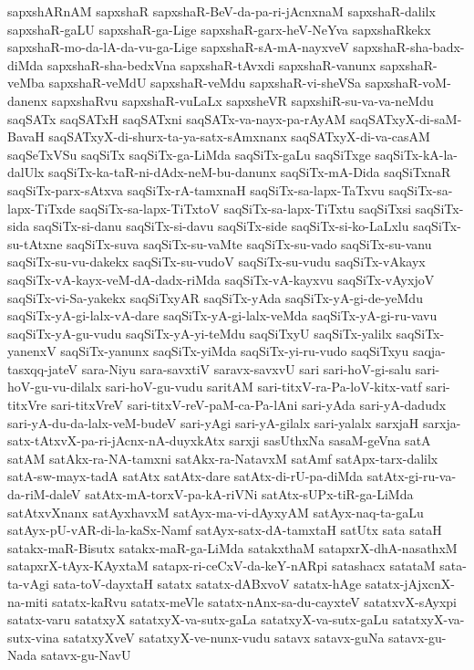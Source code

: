 {sapxshARnAM
sapxshaR
sapxshaR-BeV-da-pa-ri-jAcnxnaM
sapxshaR-dalilx
sapxshaR-gaLU
sapxshaR-ga-Lige
sapxshaR-garx-heV-NeYva
sapxshaRkekx
sapxshaR-mo-da-lA-da-vu-ga-Lige
sapxshaR-sA-mA-nayxveV
sapxshaR-sha-badx-diMda
sapxshaR-sha-bedxVna
sapxshaR-tAvxdi
sapxshaR-vanunx
sapxshaR-veMba
sapxshaR-veMdU
sapxshaR-veMdu
sapxshaR-vi-sheVSa
sapxshaR-voM-danenx
sapxshaRvu
sapxshaR-vuLaLx
sapxsheVR
sapxshiR-su-va-va-neMdu
saqSATx
saqSATxH
saqSATxni
saqSATx-va-nayx-pa-rAyAM
saqSATxyX-di-saM-BavaH
saqSATxyX-di-shurx-ta-ya-satx-sAmxnanx
saqSATxyX-di-va-casAM
saqSeTxVSu
saqSiTx
saqSiTx-ga-LiMda
saqSiTx-gaLu
saqSiTxge
saqSiTx-kA-la-dalUlx
saqSiTx-ka-taR-ni-dAdx-neM-bu-danunx
saqSiTx-mA-Dida
saqSiTxnaR
saqSiTx-parx-sAtxva
saqSiTx-rA-tamxnaH
saqSiTx-sa-lapx-TaTxvu
saqSiTx-sa-lapx-TiTxde
saqSiTx-sa-lapx-TiTxtoV
saqSiTx-sa-lapx-TiTxtu
saqSiTxsi
saqSiTx-sida
saqSiTx-si-danu
saqSiTx-si-davu
saqSiTx-side
saqSiTx-si-ko-LaLxlu
saqSiTx-su-tAtxne
saqSiTx-suva
saqSiTx-su-vaMte
saqSiTx-su-vado
saqSiTx-su-vanu
saqSiTx-su-vu-dakekx
saqSiTx-su-vudoV
saqSiTx-su-vudu
saqSiTx-vAkayx
saqSiTx-vA-kayx-veM-dA-dadx-riMda
saqSiTx-vA-kayxvu
saqSiTx-vAyxjoV
saqSiTx-vi-Sa-yakekx
saqSiTxyAR
saqSiTx-yAda
saqSiTx-yA-gi-de-yeMdu
saqSiTx-yA-gi-lalx-vA-dare
saqSiTx-yA-gi-lalx-veMda
saqSiTx-yA-gi-ru-vavu
saqSiTx-yA-gu-vudu
saqSiTx-yA-yi-teMdu
saqSiTxyU
saqSiTx-yalilx
saqSiTx-yanenxV
saqSiTx-yanunx
saqSiTx-yiMda
saqSiTx-yi-ru-vudo
saqSiTxyu
saqja-tasxqq-jateV
sara-Niyu
sara-savxtiV
saravx-savxvU
sari
sari-hoV-gi-salu
sari-hoV-gu-vu-dilalx
sari-hoV-gu-vudu
saritAM
sari-titxV-ra-Pa-loV-kitx-vatf
sari-titxVre
sari-titxVreV
sari-titxV-reV-paM-ca-Pa-lAni
sari-yAda
sari-yA-dadudx
sari-yA-du-da-lalx-veM-budeV
sari-yAgi
sari-yA-gilalx
sari-yalalx
sarxjaH
sarxja-satx-tAtxvX-pa-ri-jAcnx-nA-duyxkAtx
sarxji
sasUthxNa
sasaM-geVna
satA
satAM
satAkx-ra-NA-tamxni
satAkx-ra-NatavxM
satAmf
satApx-tarx-dalilx
satA-sw-mayx-tadA
satAtx
satAtx-dare
satAtx-di-rU-pa-diMda
satAtx-gi-ru-va-da-riM-daleV
satAtx-mA-torxV-pa-kA-riVNi
satAtx-sUPx-tiR-ga-LiMda
satAtxvXnanx
satAyxhavxM
satAyx-ma-vi-dAyxyAM
satAyx-naq-ta-gaLu
satAyx-pU-vAR-di-la-kaSx-Namf
satAyx-satx-dA-tamxtaH
satUtx
sata
sataH
satakx-maR-Bisutx
satakx-maR-ga-LiMda
satakxthaM
satapxrX-dhA-nasathxM
satapxrX-tAyx-KAyxtaM
satapx-ri-ceCxV-da-keY-nARpi
satashacx
satataM
sata-ta-vAgi
sata-toV-dayxtaH
satatx
satatx-dABxvoV
satatx-hAge
satatx-jAjxcnX-na-miti
satatx-kaRvu
satatx-meVle
satatx-nAnx-sa-du-cayxteV
satatxvX-sAyxpi
satatx-varu
satatxyX
satatxyX-va-sutx-gaLa
satatxyX-va-sutx-gaLu
satatxyX-va-sutx-vina
satatxyXveV
satatxyX-ve-nunx-vudu
satavx
satavx-guNa
satavx-gu-Nada
satavx-gu-NavU
}
